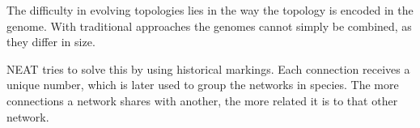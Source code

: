 The difficulty in evolving topologies lies in the way the topology is encoded in the genome. With traditional approaches the genomes cannot simply be combined, as they differ in size.

NEAT tries to solve this by using historical markings. Each connection receives a unique number, which is later used to group the networks in species. The more connections a network shares with another, the more related it is to that other network.
